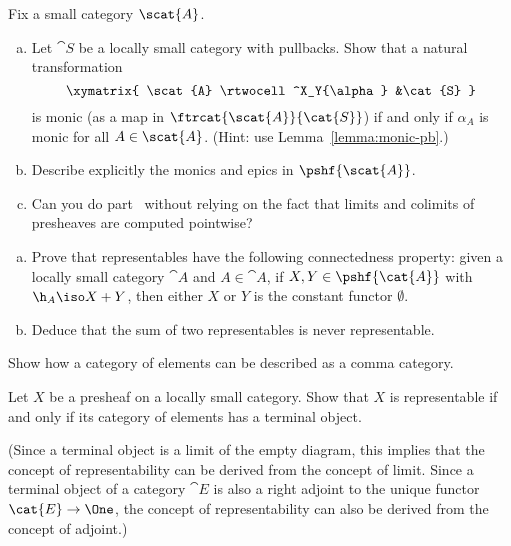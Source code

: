 \exs


\begin{question}
Fix a small category $\scat{A}$.
% 
\begin{enumerate}[(b)]
\item
Let $\cat{S}$ be a locally small category with pullbacks.  Show that a
natural transformation
\[
\xymatrix{
\scat{A} \rtwocell^X_Y{\alpha} &\cat{S}
}
\]
is monic (as a map in $\ftrcat{\scat{A}}{\cat{S}}$) if and only if $\alpha_A$
is monic for all $A \in \scat{A}$.  (Hint: use Lemma~\ref{lemma:monic-pb}.)

\item   
\label{part:monic-epic-transf}
Describe explicitly the monics and epics in $\pshf{\scat{A}}$.%
%
%
%

\item 
Can you do part~ without relying on the fact
that limits and colimits of presheaves are computed pointwise?
\end{enumerate}
\end{question}


\begin{question}
\begin{enumerate}[(b)]
\item 
Prove that representables have the following connectedness%
%
%
property: given a locally small category $\cat{A}$ and $A \in \cat{A}$, if
$X, Y \in \pshf{\cat{A}}$ with $\h_A \iso X + Y$, then either $X$ or $Y$ is
the constant functor $\emptyset$.

\item
Deduce that the sum%
%
%
of two representables is never representable.
\end{enumerate}
\end{question}


\begin{question}
Show how a category of elements can be described as a comma category.
\end{question}


\begin{question}
Let $X$ be a presheaf on a locally small category.  Show that $X$ is
representable if and only if its category of elements has a terminal
object.

(Since a terminal object is a limit of the empty diagram, this implies that
the concept of representability can be derived from the concept of limit.
Since a terminal object of a category $\cat{E}$ is also a right adjoint to
the unique functor $\cat{E} \to \One$, the concept of representability can
also be derived from the concept of adjoint.)
\end{question}


